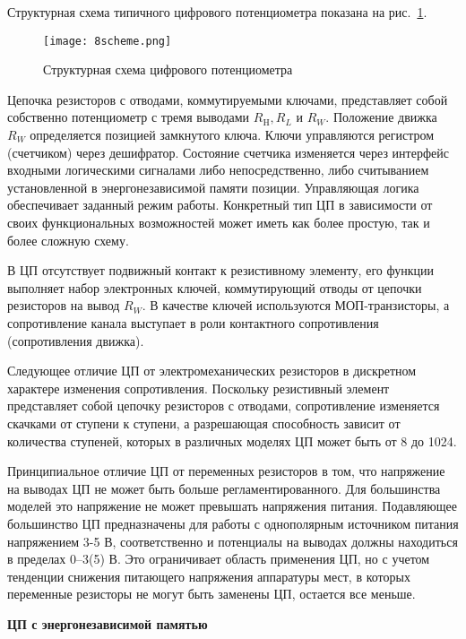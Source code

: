 Структурная схема типичного цифрового потенциометра показана на рис.~\ref{pic:8scheme}.

\begin{figure}[h!]
	\caption{ Структурная схема цифрового потенциометра }
	\texttt{[image: 8scheme.png]}
	\label{pic:8scheme}
\end{figure}

Цепочка резисторов с отводами, коммутируемыми ключами, представляет собой собственно потенциометр с тремя выводами $ R_\text{H}, R_L $ и $ R_W $. Положение движка $ R_W $ определяется позицией замкнутого ключа. Ключи управляются регистром (счетчиком) через дешифратор. Состояние счетчика изменяется через интерфейс входными логическими сигналами либо непосредственно, либо считыванием установленной в энергонезависимой памяти позиции. Управляющая логика обеспечивает заданный режим работы. Конкретный тип ЦП в зависимости от своих функциональных возможностей может иметь как более простую, так и более сложную схему.

В ЦП отсутствует подвижный контакт к резистивному элементу, его функции выполняет набор электронных ключей, коммутирующий отводы от цепочки резисторов на вывод $ R_W $. В качестве ключей используются МОП-транзисторы, а сопротивление канала выступает в роли контактного сопротивления (сопротивления движка). 

Следующее отличие ЦП от электромеханических резисторов в дискретном характере изменения сопротивления. Поскольку резистивный элемент представляет собой цепочку резисторов с отводами, сопротивление изменяется скачками от ступени к ступени, а разрешающая способность зависит от количества ступеней, которых в различных моделях ЦП может быть от 8 до 1024. 

Принципиальное отличие ЦП от переменных резисторов в том, что напряжение на выводах ЦП не может быть больше регламентированного. Для большинства моделей это напряжение не может превышать напряжения питания. Подавляющее большинство ЦП предназначены для работы с однополярным источником питания напряжением 3-5 В, соответственно и потенциалы на выводах должны находиться в пределах 0–3(5) В. Это ограничивает область применения ЦП, но с учетом тенденции снижения питающего напряжения аппаратуры мест, в которых переменные резисторы не могут быть заменены ЦП, остается все меньше.

\begin{flushleft}
\textbf{ЦП с энергонезависимой памятью}
\end{flushleft}

